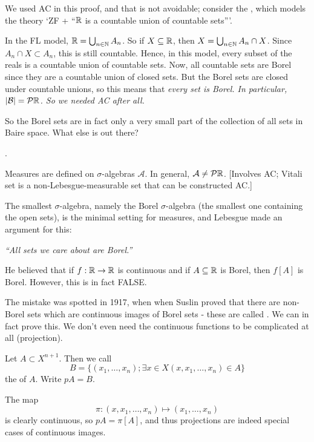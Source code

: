 \documentclass[]{article}
\begin{document}
\begin{remark*}
    We used AC in this proof, and that is not avoidable; consider the , which models the theory `ZF + ``$\mathbb{R}$ is a countable union of countable sets'''.

    In the FL model, $\mathbb{R} = \bigcup_{n\in\mathbb{N}}A_n$. So if $X \subseteq \mathbb{R}$, then $X = \bigcup_{n\in\mathbb{N}} A_n\cap X$. Since $A_n\cap X \subset A_n$, this is still countable. Hence, in this model, every subset of the reals is a countable union of countable sets. Now, all countable sets are Borel since they are a countable union of closed sets. But the Borel sets are closed under countable unions, so this means that \it{every} set is Borel. In particular, $|\mathcal{B}| = \mathcal{P}\mathbb{R}$. So we needed AC after all.
\end{remark*}

So the Borel sets are in fact only a very small part of the collection of all sets in Baire space. What else is out there?

.

Measures are defined on $\sigma$-algebras $\mathcal{A}$. In general, $\mathcal{A} \ne \mathcal{P}\mathbb{R}$. [Involves AC; Vitali set is a non-Lebesgue-measurable set that can be constructed AC.]

The smallest $\sigma$-algebra, namely the Borel $\sigma$-algebra (the smallest one containing the open sets), is the minimal setting for measures, and Lebesgue made an argument for this:

\begin{remark*}[Lebesgue]
    \emph{
        ``All sets we care about are Borel.''
    }
\end{remark*}

He believed that if $f:\mathbb{R} \rightarrow \mathbb{R}$ is continuous and if $A\subseteq \mathbb{R}$ is Borel, then $f[A]$ is Borel. However, this is in fact FALSE.

The mistake was spotted in 1917, when when Suslin proved that there are non-Borel sets which are continuous images of Borel sets - these are called . We can in fact prove this. We don't even need the continuous functions to be complicated at all (projection).

\begin{defin*}[Projection]
    Let $A\subset X^{n+1}$. Then we call $$B = \{(x_1,\dots,x_n); \exists x \in X (x,x_1,\dots,x_n)\in A\}$$ the  of $A$. Write $pA = B$.

    The map $$\pi : (x,x_1,\dots,x_n) \mapsto (x_1,\dots,x_n)$$ is clearly continuous, so $pA = \pi[A]$, and thus projections are indeed special cases of continuous images.
\end{defin*}
\end{document}
